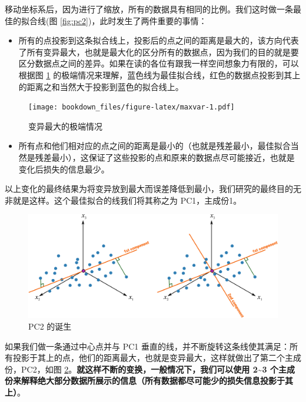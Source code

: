 \documentclass[
]{krantz}
\providecommand{\tightlist}{%
  \setlength{\itemsep}{0pt}\setlength{\parskip}{0pt}}
\begin{document}
移动坐标系后，因为进行了缩放，所有的数据具有相同的比例。我们这时做一条最佳的拟合线(图 \ref{fig:pc2})，此时发生了两件重要的事情：

\begin{itemize}
\tightlist
\item
  所有的点投影到这条拟合线上，投影后的点之间的距离是最大的，该方向代表了所有变异最大，也就是最大化的区分所有的数据点，因为我们的目的就是要区分数据点之间的差异。如果在读的各位有跟我一样空间想象力有限的，可以根据图 \ref{fig:maxvar} 的极端情况来理解，蓝色线为最佳拟合线，红色的数据点投影到其上的距离之和当然大于投影到蓝色的拟合线上。
\end{itemize}

\begin{figure}
\centering
\texttt{[image: bookdown\_files/figure-latex/maxvar-1.pdf]}
\caption{\label{fig:maxvar}变异最大的极端情况}
\end{figure}

\begin{itemize}
\tightlist
\item
  所有点和他们相对应的点之间的距离是最小的（也就是残差最小，最佳拟合当然是残差最小），这保证了这些投影的点和原来的数据点尽可能接近，也就是变化后损失的信息最少。
\end{itemize}

以上变化的最终结果为将变异放到最大而误差降低到最小，我们研究的最终目的无非就是这样。这个最佳拟合的线我们将其称之为 PC1，主成份1。

\begin{figure}
\includegraphics[width=1\linewidth]{images/pc3} \caption{PC2 的诞生}\label{fig:pc3}
\end{figure}

如果我们做一条通过中心点并与 PC1 垂直的线，并不断旋转这条线使其满足：所有投影于其上的点，他们的距离最大，也就是变异最大，这样就做出了第二个主成份，PC2，如图 \ref{fig:pc3}。\textbf{就这样不断的变换，一般情况下，我们可以使用 2\textasciitilde{}3 个主成份来解释绝大部分数据所展示的信息（所有数据都尽可能少的损失信息投影于其上）}。
\end{document}
